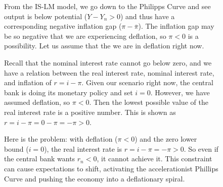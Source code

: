 \documentclass{extarticle}
\begin{document}
\begin{figure}[H]
\begin{minipage}{0.65\linewidth}
    \vspace{2mm}
    From the IS-LM model, we go down to the Philipps Curve and see output is below potential ($Y - Y_n > 0$) and thus have a corresponding negative inflation gap ($\pi - \overline{\pi}$). The inflation gap may be so negative that we are experiencing deflation, so $\pi < 0$ is a possibility. Let us assume that the we are in deflation right now.
    
    \vspace{2mm}
    Recall that the nominal interest rate cannot go below zero, and we have a relation between the real interest rate, nominal interest rate, and inflation of $r = i - \pi$. Given our scenario right now, the central bank is doing its monetary policy and set $i = 0$. However, we have assumed deflation, so $\pi < 0$. Then the lowest possible value of the real interest rate is a positive number. This is shown as $r = i - \pi = 0 - \pi = -\pi > 0$. 

    \vspace{2mm}
    Here is the problem: with deflation ($\pi < 0$) and the zero lower bound ($i = 0$), the real interest rate is $r = i - \pi = -\pi > 0$. So even if the central bank wants $r_n < 0$, it cannot achieve it. 
    This constraint can cause expectations to shift, activating the accelerationist Phillips Curve and pushing the economy into a deflationary spiral.

  \end{minipage} 
\end{figure}
\end{document}
